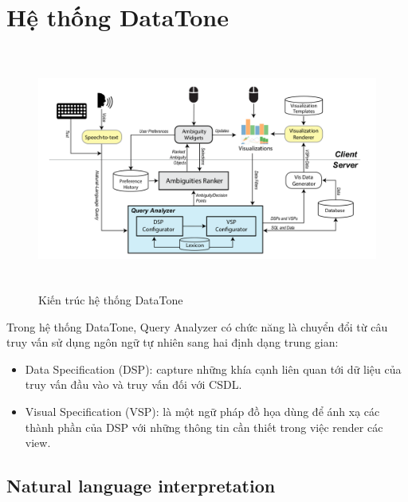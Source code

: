 \documentclass[12pt]{report}
\begin{document}
\section{Hệ thống DataTone}
\begin{figure}[h!]
	\centering
	\includegraphics[width=15cm, height=8cm]{DataToneSystem.png}
	\caption{Kiến trúc hệ thống DataTone}
\end{figure}
Trong hệ thống DataTone, Query Analyzer có chức năng là chuyển đổi từ câu truy vấn sử dụng ngôn ngữ tự nhiên sang hai định dạng trung gian:
\begin{itemize}
	\item Data Specification (DSP): capture những khía cạnh liên quan tới dữ liệu của truy vấn đầu vào và truy vấn đối với CSDL.
	\item Visual Specification (VSP): là một ngữ pháp đồ họa dùng để ánh xạ các thành phần của DSP với những thông tin cần thiết trong việc render các view. 
\end{itemize}
\subsection{Natural language interpretation}
\end{document}
